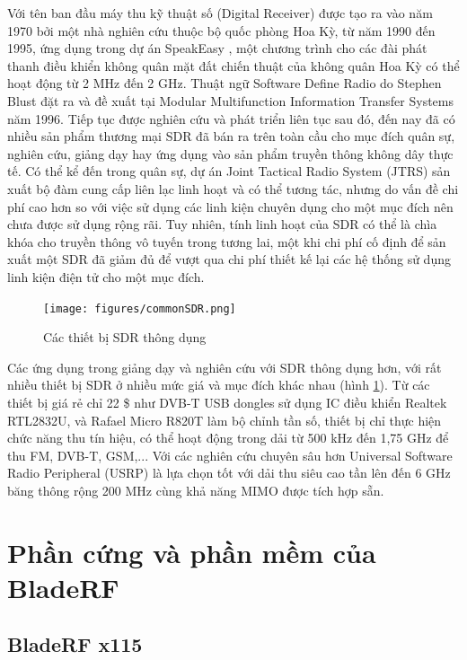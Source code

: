 Với tên ban đầu máy thu kỹ thuật số (Digital Receiver) được tạo ra vào năm 1970 bởi một nhà nghiên cứu thuộc bộ quốc phòng Hoa Kỳ, từ năm 1990 đến 1995, ứng dụng trong dự án SpeakEasy \cite{Fakhrian2012}, một chương trình cho các đài phát thanh điều khiển không quân mặt đất chiến thuật của không quân Hoa Kỳ có thể hoạt động từ 2 MHz đến 2 GHz. Thuật ngữ Software Define Radio do Stephen Blust đặt ra và đề xuất tại Modular Multifunction Information Transfer Systems năm 1996. Tiếp tục được nghiên cứu và phát triển liên tục sau đó, đến nay đã có nhiều sản phẩm thương mại SDR đã bán ra trên toàn cầu cho mục đích quân sự, nghiên cứu, giảng dạy hay ứng dụng vào sản phẩm truyền thông không dây thực tế. Có thể kể đến trong quân sự, dự án Joint Tactical Radio System (JTRS) \cite{Feickert2005} sản xuất bộ đàm cung cấp liên lạc linh hoạt và có thể tương tác, nhưng do vấn đề chi phí cao hơn so với việc sử dụng các linh kiện chuyên dụng cho một mục đích nên chưa được sử dụng rộng rãi. Tuy nhiên, tính linh hoạt của SDR có thể là chìa khóa cho truyền thông vô tuyến trong tương lai, một khi chi phí cố định để sản xuất một SDR đã giảm đủ để vượt qua chi phí thiết kế lại các hệ thống sử dụng linh kiện điện tử cho một mục đích.

\begin{figure} [!htb]
	\centering
	\texttt{[image: figures/commonSDR.png]}
	\caption{Các thiết bị SDR thông dụng}
	\label{fig:commonSDR}
\end{figure}

Các ứng dụng trong giảng dạy và nghiên cứu với SDR thông dụng hơn, với rất nhiều thiết bị SDR ở nhiều mức giá và mục đích khác nhau (hình \ref{fig:commonSDR}). Từ các thiết bị giá rẻ chỉ 22 \$ như DVB-T USB dongles sử dụng IC điều khiển Realtek RTL2832U, và Rafael Micro R820T làm bộ chỉnh tần số, thiết bị chỉ thực hiện chức năng thu tín hiệu, có thể hoạt động trong dải từ 500 kHz đến 1,75 GHz để thu FM, DVB-T, GSM,... Với các nghiên cứu chuyên sâu hơn Universal Software Radio Peripheral (USRP) là lựa chọn tốt với dải thu siêu cao tần lên đến 6 GHz băng thông rộng 200 MHz cùng khả năng MIMO được tích hợp sẵn.

\section{Phần cứng và phần mềm của BladeRF}

\subsection{BladeRF x115}

